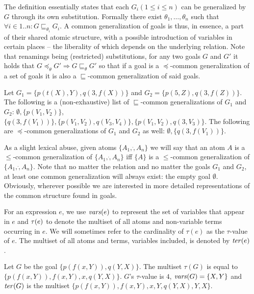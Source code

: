 The definition essentially states that each $G_i (1\le i\le n)$ can be generalized by $G$ through its own substitution. Formally there exist $\theta_1, \dots, \theta_n$ such that $\forall i \in 1..n : G \sqsubseteq_{\theta_i} G_i$. A common generalization of goals is thus, in essence, a part of their shared atomic structure, with a possible introduction of variables in certain places -- the liberality of which depends on the underlying relation. Note that renamings being (restricted) substitutions, for any two goals $G$ and $G'$ it holds that $G\preceq_\theta G' \Rightarrow G\sqsubseteq_\theta G'$ so that if a goal is a $\preceq$-common generalization of a set of goals it is also a $\sqsubseteq$-common generalization of said goals. 

\begin{example}\label{ex:common-gen}
	Let $G_1 = \{p(t(X), Y), q(3, f(X))\}$ and $G_2 = \{p(5, Z), q(3, f(Z))\}$. The following is a (non-exhaustive) list of $\sqsubseteq$-common generalizations of $G_1$ and $G_2$: $\emptyset, \{p(V_1, V_2)\}$, $\{q(3, f(V_1))\}, \{p(V_1, V_2), q(V_3, V_4)\}, \{p(V_1, V_2), q(3, V_3)\}$. The following are $\preceq$-common generalizations of $G_1$ and $G_2$ as well: $\emptyset, \{q(3, f(V_1))\}$. 
\end{example} 

As a slight lexical abuse, given atoms $\{A_1,\dot,A_n\}$ we will say that an atom $A$ is a $\leqslant$-common generalization of $\{A_1,\dot,A_n\}$ iff $\{A\}$ is a $\leqslant$-common generalization of $\{A_1,\dot,A_n\}$.
%
Note that no matter the relation and no matter the goals $G_1$ and $G_2$, at least one common generalization will always exist: the empty goal $\emptyset$. Obviously, wherever possible we are interested in more detailed representations of the common structure found in goals. 

For an expression $e$, we use $\mathit{vars}(e)$ to represent the set of variables that appear in $e$ and $\tau(e)$ to denote the multiset of all atoms and non-variable terms occurring in $e$. We will sometimes refer to the cardinality of $\tau(e)$ as the $\tau$-value of $e$. The multiset of all atoms and terms, variables included, is denoted by $\mathit{ter}(e)$.
\begin{example}
	Let $G$ be the goal $\{p(f(x, Y)), q(Y,X)\}$. The multiset $\tau(G)$ is equal to $\{p(f(x,Y)), f(x,Y), x, q(Y,X)\}$. $G$'s $\tau$-value is $4$, $\mathit{vars}(G) = \{X,Y\}$ and $\mathit{ter}(G)$ is the multiset $\{p(f(x,Y)), f(x,Y), x, Y, q(Y,X), Y, X\}$. 
\end{example} %

